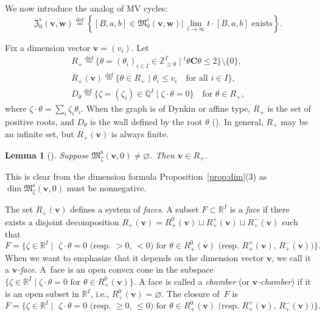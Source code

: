 \documentclass[10pt,a4paper]{amsart}
\newtheorem{Lemma}[equation]{Lemma}
\theoremstyle{definition}
\numberwithin{equation}{section}
\newcommand{\propref}[1]{Proposition~\ref{#1}}
\newcommand{\defeq}{\overset{\operatorname{\scriptstyle def}}{=}}
\newcommand{\Z}{{\mathbb Z}}
\newcommand{\Q}{{\mathbb Q}}
\newcommand{\R}{{\mathbb R}}
\newcommand{\M}{{\mathfrak M}} %
\newcommand{\Mreg}{\M^{\operatorname{s}}}
\newcommand{\bv}{{\mathbf v}} %
\newcommand{\bw}{{\mathbf w}} %
\newcommand{\bC}{{\mathbf C}} %
\begin{document}
We now introduce the analog of MV cycles:
\begin{equation*}
  \mathfrak Z_0^{\operatorname{s}}(\bv,\bw) \defeq
  \left\{ [B,a,b]\in\Mreg_0(\bv,\bw) \big|\,
      \text{$\displaystyle\lim_{t\to \infty} t\cdot[B,a,b]$ exists}
      \right\}.
\end{equation*}


Fix a dimension vector $\bv = (v_i)$. Let
\begin{gather*}
   R_+  \defeq \{ \theta = (\theta_i)_{i\in I} \in \Z_{\ge 0}^I \mid
     {}^t\theta \bC \theta \le 2\} \setminus \{0\}, \\
   R_+(\bv) \defeq \{ \theta\in R_+ \mid \theta_i \le v_i
       \quad\text{for all $i\in I$}\}, \\
   D_\theta \defeq \{ \zeta = (\zeta_i)\in \Q^I \mid
   \zeta\cdot \theta = 0 \} \quad\text{for $\theta\in R_+$},
\end{gather*}
where $\zeta\cdot \theta = \sum_i \zeta_i\theta_i$. When the graph is
of Dynkin or af\/f\/ine type, $R_+$ is the set of positive roots, and
$D_\theta$ is the wall def\/ined by the root $\theta$
(\cite[Proposition~5.10]{Kac}).
%
In general, $R_+$ may be an inf\/inite set, but $R_+(\bv)$ is always
f\/inite.

\begin{Lemma}[]\label{lem:nondeg}
  Suppose $\Mreg_\zeta(\bv,0)\neq\varnothing$. Then $\bv \in R_+$.
\end{Lemma}

This is clear from the dimension formula \propref{prop:dim}(3) as
$\dim \Mreg_\zeta(\bv,0)$ must be nonnegative.

The set $R_+(\bv)$ def\/ines a system of {\it faces\/}. A subset
$F\subset \R^I$ is a {\it face\/} if there exists a disjoint
decomposition $R_+(\bv) = R_+^0(\bv) \sqcup R_+^+(\bv) \sqcup
R_+^-(\bv)$ such that
\begin{equation*}
    F = \{ \zeta\in \R^I \mid \text{
     $\zeta\cdot \theta = 0$ (resp.\ $> 0$, $< 0$) for
    $\theta\in R_+^0(\bv)$ (resp.\ $R_+^+(\bv)$, $R_+^-(\bv)$)}\}.
\end{equation*}
%
When we want to emphasize that it depends on the dimension vector
$\bv$, we call it a {\it $\bv$-face}.
%
A~face is an open convex cone in the subspace $\{ \zeta\in\R^I \mid
\text{$\zeta\cdot\theta = 0$ for $\theta\in R_+^0(\bv)$}\}$. A face is
called a {\it chamber\/} (or {\it $\bv$-chamber\/}) if it is an open
subset in $\R^I$, i.e., $R_+^0(\bv) = \varnothing$. The closure of~$F$
is
\begin{equation*}
    \overline{F} = \{ \zeta\in \R^I \mid \text{
     $\zeta\cdot \theta = 0$ (resp.\ $\ge 0$, $\le 0$) for
    $\theta\in R_+^0(\bv)$ (resp.\ $R_+^+(\bv)$, $R_+^-(\bv)$)}\}.
\end{equation*}
\end{document}
